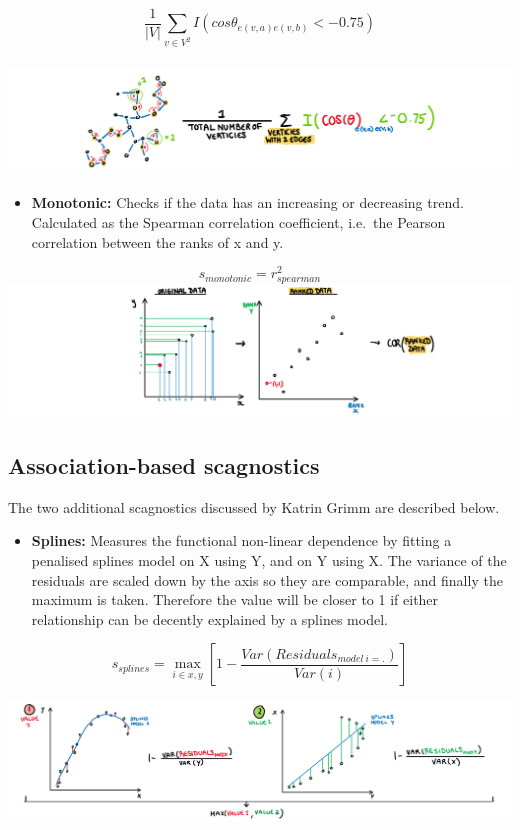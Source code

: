 \[\frac1{|V|}\sum_{v \in V^{2}}I(cos\theta_{e(v,a)e(v,b)}<-0.75)\]\\
\includegraphics{figures/drawstriated.png}

\begin{itemize}
\tightlist
\item
  \textbf{Monotonic:} Checks if the data has an increasing or decreasing
  trend. Calculated as the Spearman correlation coefficient, i.e.~the
  Pearson correlation between the ranks of x and y.
\end{itemize}

\[s_{monotonic} = r^2_{spearman}\]
\includegraphics{figures/drawmonotonic.png}

\hypertarget{association-based-scagnostics}{%
\subsection{Association-based
scagnostics}\label{association-based-scagnostics}}

The two additional scagnostics discussed by Katrin Grimm are described
below.

\begin{itemize}
\tightlist
\item
  \textbf{Splines:} Measures the functional non-linear dependence by
  fitting a penalised splines model on X using Y, and on Y using X. The
  variance of the residuals are scaled down by the axis so they are
  comparable, and finally the maximum is taken. Therefore the value will
  be closer to 1 if either relationship can be decently explained by a
  splines model.
\end{itemize}

\[s_{splines}=\max_{i\in x,y}[1-\frac{Var(Residuals_{model~i=.})}{Var(i)}]\]

\includegraphics{figures/drawsplines.png}

